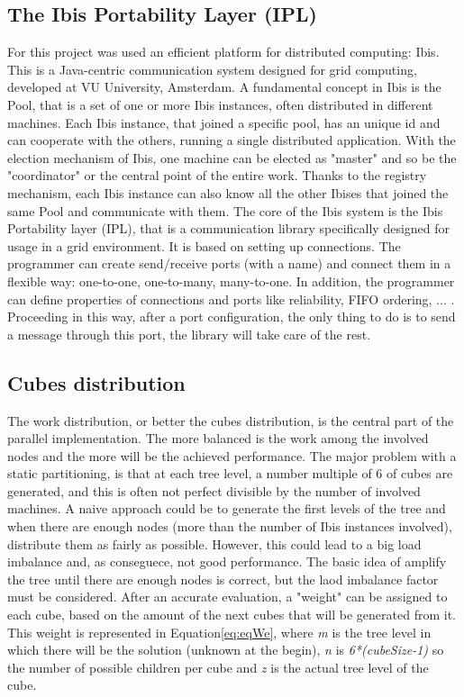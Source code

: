 \documentclass[a4paper]{article}
\begin{document}
\subsection{The Ibis Portability Layer (IPL)}
\label{sec:ibis}
For this project was used an efficient platform for distributed computing: Ibis. This is a Java-centric communication system designed for grid computing, developed at VU University, Amsterdam. A fundamental concept in Ibis is the Pool, that is a set of one or more Ibis instances, often distributed in different machines. Each Ibis instance, that joined a specific pool, has an unique id and can cooperate with the others, running a single distributed application. With the election mechanism of Ibis, one machine can be elected as "master" and so be the "coordinator" or the central point of the entire work. Thanks to the registry mechanism, each Ibis instance can also know all the other Ibises that joined the same Pool and communicate with them. The core of the Ibis system is the  Ibis Portability layer (IPL), that is a communication library specifically designed for usage in a grid environment. It is based on setting up connections. The programmer can create send/receive ports (with a name) and connect them in a flexible way: one-to-one, one-to-many, many-to-one. In addition, the programmer can define properties of connections and ports like reliability, FIFO ordering, ... . Proceeding in this way, after a port configuration, the only thing to do is to send a message through this port, the library will take care of the rest. 

\subsection{Cubes distribution}
\label{sec:cubes_distr}
The work distribution, or better the cubes distribution, is the central part of the parallel implementation. The more balanced is the work among the involved nodes and the more will be the achieved performance. The major problem with a static partitioning, is that at each tree level, a number multiple of 6 of cubes are generated, and this is often not perfect divisible by the number of involved machines. A naive approach could be to generate the first levels of the tree and when there are enough nodes (more than the number of Ibis instances involved), distribute them as fairly as possible. However, this could lead to a big load imbalance and, as conseguece, not good performance. The basic idea of amplify the tree until there are enough nodes is correct, but the laod imbalance factor must be considered. After an accurate evaluation, a "weight" can be assigned to each cube, based on the amount of the next cubes that will be generated from it. This weight is represented in Equation\ref{eq:eqWe}, where \textit{m} is the tree level in which there will be the solution (unknown at the begin), \textit{n} is \textit{6*(cubeSize-1)} so the number of possible children per cube and \textit{z} is the actual tree level of the cube.
\end{document}
